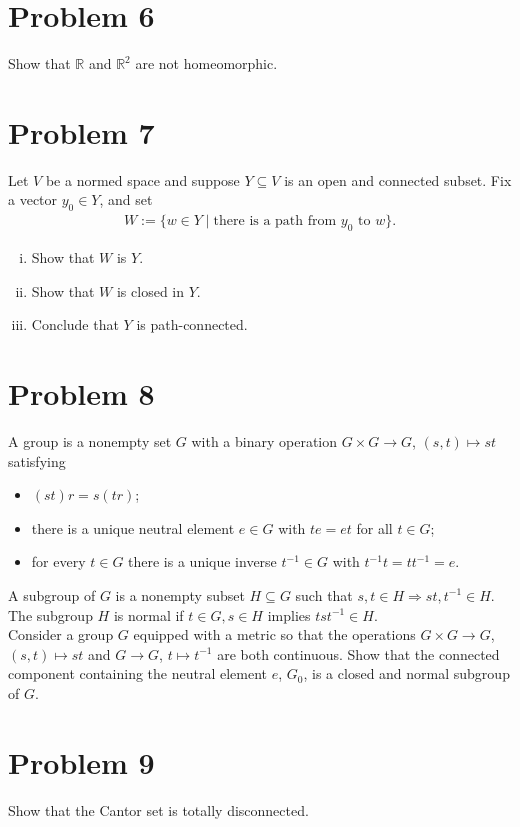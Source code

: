 \documentclass[8pt]{extarticle}
\newcommand{\R}{\mathbb{R}}
\begin{document}
  \section{Problem 6}%
  Show that $\R$ and $\R^2$ are not homeomorphic.
  \section{Problem 7}%
  Let $V$ be a normed space and suppose $Y\subseteq V$ is an open and connected subset. Fix a vector $y_0\in Y$, and set
  \begin{align*}
    W := \{w\in Y\mid \text{there is a path from $y_0$ to $w$}\}.
  \end{align*}
  \begin{enumerate}[(i)]
    \item Show that $W$ is $Y$.
    \item Show that $W$ is closed in $Y$.
    \item Conclude that $Y$ is path-connected.
  \end{enumerate}
  \section{Problem 8}%
  A group is a nonempty set $G$ with a binary operation $G\times G \rightarrow G$, $(s,t)\mapsto st$ satisfying
  \begin{itemize}
    \item $(st)r = s(tr)$;
    \item there is a unique neutral element $e\in G$ with $te = et$ for all $t\in G$;
    \item for every $t\in G$ there is a unique inverse $t^{-1}\in G$ with $t^{-1}t = tt^{-1} = e$.
  \end{itemize}
  A subgroup of $G$ is a nonempty subset $H\subseteq G$ such that $s,t\in H \Rightarrow st,t^{-1}\in H$. The subgroup $H$ is normal if $t\in G,s\in H$ implies $tst^{-1}\in H$.\\

  Consider a group $G$ equipped with a metric so that the operations $G\times G \rightarrow G$, $(s,t)\mapsto st$ and $G\rightarrow G$, $t\mapsto t^{-1}$ are both continuous. Show that the connected component containing the neutral element $e$, $G_0$, is a closed and normal subgroup of $G$.
  \section{Problem 9}%
  Show that the Cantor set is totally disconnected.
\end{document}

